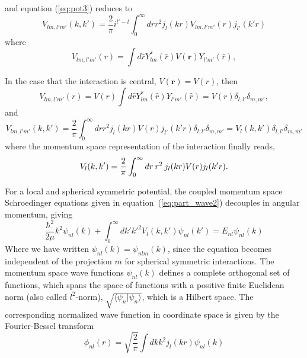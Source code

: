 \documentclass[graybox,sectrefs,envcountresetchap,open=right]{svmonodo}
\begin{document}
and equation (\ref{eq:pot3}) reduces to  
\begin{equation}
  V_{lm, l'm'}(k,k') = \frac{2}{\pi}i^{l' -l}\int_0^\infty drr^2j_l(kr) V_{lm,l'm'}(r) j_{l'}(k'r)
  \label{eq:pot6}
\end{equation}
where 
\begin{equation}
  V_{lm, l'm'}(r) = \int d{\hat{r}}Y_{lm}^*(\hat{r})V(\mathbf{r})Y_{l'm'}(\hat{r}),
  \label{eq:pot10}
\end{equation}



In the case that the interaction is central, $V(\mathbf{r}) = V(r)$, then
\begin{equation}
  V_{lm, l'm'}(r) = V(r) \int d{\hat{r}}Y_{lm}^*(\hat{r})Y_{l'm'}(\hat{r}) = V(r) \delta_{l,l'}\delta_{m,m'},
  \label{eq:pot7}
\end{equation}
and 
\begin{equation}
  V_{lm, l'm'}(k,k') = \frac{2}{\pi} \int_0^\infty drr^2j_l(kr) V(r) j_{l'}(k'r)\delta_{l,l'}\delta_{m,m'} = V_l(k,k') \delta_{l,l'}\delta_{m,m'}
  \label{eq:pot8}
\end{equation}
where the momentum space representation of the interaction finally reads,
\begin{equation}
  V_{l}(k,k') = {2 \over \pi} \int_0^\infty dr\: r^2 \:
  j_l(kr) V(r) j_{l}(k'r).
  \label{eq:pot9}
\end{equation}



For a local and spherical symmetric potential, 
the coupled momentum space Schroedinger equations given in equation~(\ref{eq:part_wave2})
decouples in angular momentum, 
giving
\begin{equation}
\frac{\hbar^2}{2\mu} k^2 \psi_{n l}(k) +\int_{0}^\infty dk' {k'}^2 V_{l}(k,k') \psi_{n l }(k')=E_{n l} \psi_{n l}(k) 
  \label{eq:momentum_space}
\end{equation}   
Where we have written $\psi_{n l }(k)=\psi_{nlm}(k)$, since the 
equation becomes independent of the projection $m$ for spherical symmetric interactions. 
The momentum space wave functions $\psi_{n l}(k)$ defines a complete orthogonal set 
of functions, which spans the space of functions with a positive finite Euclidean norm 
 (also called $l^2$-norm), $\sqrt{\langle\psi_n\vert\psi_n\rangle}$, which 
is a Hilbert space. The corresponding normalized wave function in coordinate space
is given by the Fourier-Bessel transform 
\[
  \phi_{n l}(r)  = \sqrt{\frac{2}{\pi}}\int dk k^2 j_l(kr) \psi_{n l}(k)
\]    
\end{document}
